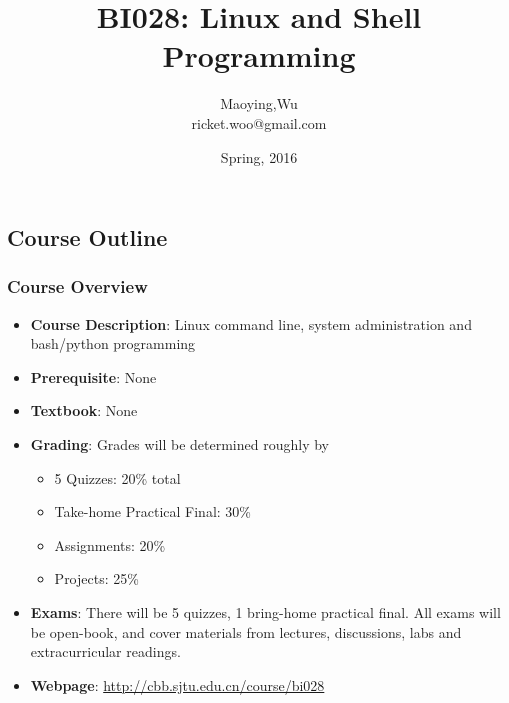 \documentclass[red]{beamer}
\title[BI028]{BI028: Linux and Shell Programming}
\author[Maoying]{Maoying,Wu\\
{\scriptsize ricket.woo@gmail.com}}
\institute[CBB] %
{
  \inst{}
  Dept. of Bioinformatics \& Biostatistics\\
  Shanghai Jiao Tong University
}
\date{Spring, 2016}
\begin{document}
\begin{CJK*}{GBK}{kai}
\frame{\titlepage}

\section[Outline]{Course Outline}
\begin{frame}
\frametitle{Course Overview}
\begin{itemize}
	\item \textbf{Course Description}: Linux command line, system administration and 
		bash/python programming
	\item \textbf{Prerequisite}: None
    \item \textbf{Textbook}: None
    \item \textbf{Grading}: Grades will be determined roughly by
    \begin{itemize}
        \item 5 Quizzes: 20\% total
        \item Take-home Practical Final: 30\%
        \item Assignments: 20\%
        \item Projects: 25\%
    \end{itemize}
    \item \textbf{Exams}: There will be 5 quizzes, 1 bring-home practical final.
        All exams will be open-book, and cover materials from lectures, discussions, 
		labs and extracurricular readings.

    \item \textbf{Webpage}: \url{http://cbb.sjtu.edu.cn/course/bi028}
\end{itemize}
\end{frame}


\end{CJK*}
\end{document}
